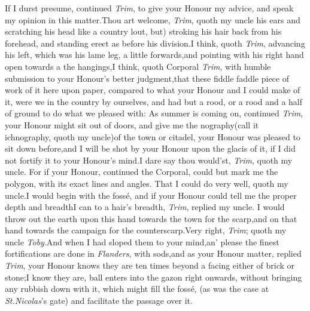 \documentclass{article}
\begin{document}
If I durst presume, continued \textit{Trim},\break 
to give your Honour my advice, and\break
speak my opinion in this matter.\tsk Thou\break
art welcome, \textit{Trim}, quoth my uncle\break
{}
his ears and scratching his head like a
country lout, but) stroking his hair back from his forehead, and
standing erect as before his division.\tsh I think, quoth
\textit{Trim}, advancing his left, which was his lame leg, a little
forwards,\tsk and pointing with his right hand open towards
a\break
{}
the
hangings,\tsk I think, quoth Corporal \textit{Trim}, with
humble submission to your Honour’s better
judgment,\tsh that these
fiddle faddle piece of work of it here\break
upon paper, compared to what your Honour and I
could make of it, were we in the country by ourselves, and had but a
rood, or a rood and a half of ground to do what we pleased with: As
summer is coming on, continued \textit{Trim}, your Honour might sit out
of doors, and give me\break
the nography\tsh (call it ichnography,
quoth my uncle)\tsk of the town or cita\-del, your Honour
was pleased to sit down before,\tsk and I will be shot by your
Honour upon the glacis of it, if I did not fortify it to your
Honour’s mind.\tsh I dare say thou would’st,
\textit{Trim}, quoth my uncle.\break
\tsk For if your Honour, continued the 
Corporal, could but mark me the polygon,
with its exact lines and angles.\tsk\break
That I could do very well, quoth my
uncle.\tsk I would begin with the fossé,\break
and if your Honour
could tell me the proper depth and breadth\tsk I can to a
hair’s breadth, \textit{Trim}, replied my uncle.\tsk\break
I would
throw out the earth upon this hand towards the town for the
scarp,\tsk\break and on that hand towards the campaign for the
counterscarp.\tsk Very right, \textit{Trim}; quoth my uncle
\textit{Toby}.\tsk And when I had sloped them to your
mind,\tsh an’ please 
the finest fortifications are done in \textit{Flan\-ders},
with sods,\tsk and as your Honour
matter, replied \textit{Trim}, your Honour knows
they are ten times beyond a facing either
of brick or stone;\tsh I know they are,
ball enters into the gazon right onwards, 
without bringing any rubbish down with
it, which might fill the fossé, (as was the
case at \textit{St.\@ Nicolas}’s gate) and facilitate\break
the passage over it.
\end{document}
